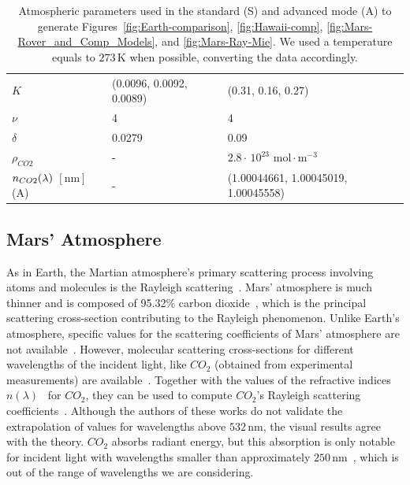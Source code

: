 \documentclass[journal]{vgtc}                %
\newcommand{\review}[1]{{\color{blue}#1}}
\begin{document}
\begin{table}[t]
{\begin{tabular}{|p{1.5cm}|p{3.2cm} p{3.2cm}|}
    {\small $K$} & {\small (0.0096, 0.0092, 0.0089)} & {\small (0.31, 0.16, 0.27)}\\
    {\small $\nu$} & {\small 4} & {\small 4}\\
    {\small $\delta$} & {\small 0.0279~\cite{Hosek:2012}} & {\small 0.09~\cite{Penndorf:1957}}\\
    {\small $\rho_{CO2}$} & {\small -} & {\small $2.8 \cdot \, 10^{23}$ $\text{mol}\cdot \text{m}^{-3}$~\cite{Ho:2002}}\\
    {\tiny $n_{\tiny CO2}(\lambda)$ $[\text{nm}]$ (A)} & {\small -} & {\tiny (1.00044661, 1.00045019, 1.00045558)~\cite{Ho:2002}}\\
    \hline
  \end{tabular}
  \vspace*{0.2cm}
  \caption{Atmospheric parameters used in the standard (S) and advanced mode (A) to generate Figures~\ref{fig:Earth-comparison}, \ref{fig:Hawaii-comp}, \ref{fig:Mars-Rover_and_Comp_Models}, and \ref{fig:Mars-Ray-Mie}. We used a temperature equals to $273\,\text{K}$ when possible, converting the data accordingly.}
  \label{tab:parameters}
} %
\vspace*{-8mm}
\end{table}
\endgroup

\vspace*{-1.5mm}
\subsection{Mars' Atmosphere}\label{sec:Mars_ATM}

\review{As in Earth, the Martian atmosphere's primary scattering process involving atoms and molecules is the Rayleigh scattering~\cite{Haberle:2017}.}
Mars' atmosphere is much thinner and \review{is composed of 95.32\% carbon dioxide~\cite{MarsFact:2018}, which is the principal scattering cross-section contributing to the Rayleigh phenomenon}. Unlike Earth's atmosphere, \review{specific} values for the scattering coefficients of Mars' atmosphere are not available~\cite{Haberle:2017}. However, molecular scattering cross-sections for different wavelengths of the incident light, like $CO_2$ (obtained from experimental measurements) are available~\cite{Sneep:2005}. Together with the values of the refractive indices $n(\lambda)$~\cite{Bideau:1973} for $CO_2$, they can be used to compute $CO_2$'s Rayleigh scattering coefficients~\cite{Ityaksov:2008}. Although the authors of these works do not validate the extrapolation of values for wavelengths above $532\,\text{nm}$, \review{the visual results agree with the theory}. $CO_2$ absorbs radiant energy, but this absorption is only notable for incident light with wavelengths smaller than \review{approximately} $250\,\text{nm}$~\cite{Haberle:2017, Ityaksov:2008}, \review{which is} out of the range of wavelengths we are considering. 
\end{document}
